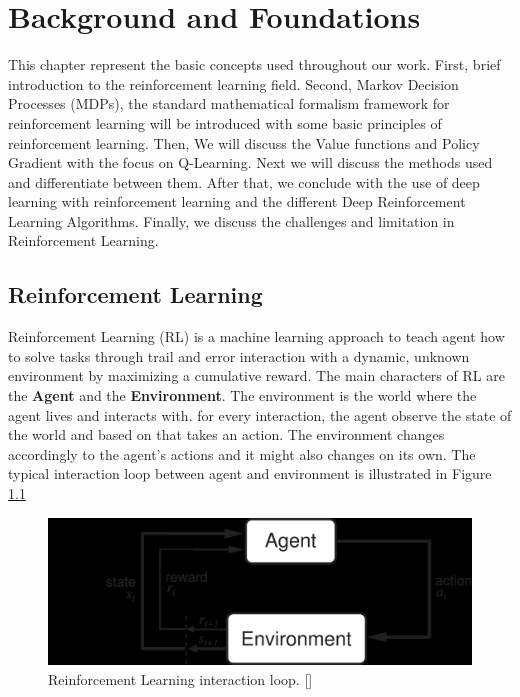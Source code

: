 
\chapter{Background and Foundations}\label{chapter:Background and Foundations}

This chapter represent the basic concepts used throughout our work. First, brief introduction to the reinforcement learning field. Second, Markov Decision Processes (MDPs), the standard mathematical formalism framework for reinforcement learning will be introduced with some basic principles of reinforcement learning. Then, We will discuss the Value functions and Policy Gradient with the focus on Q-Learning. Next we will discuss the methods used and differentiate between them. After that, we conclude with  the use of deep learning with reinforcement learning and the different Deep Reinforcement Learning Algorithms. Finally, we  discuss the challenges and limitation in Reinforcement Learning.

\section{Reinforcement Learning}
Reinforcement Learning (RL) is a machine learning approach to teach agent how to solve tasks through trail and error interaction with a dynamic, unknown environment by maximizing a cumulative reward. The main characters of RL are the \textbf{Agent} and the \textbf{Environment}. The environment is the world where the agent lives and interacts with. for every interaction, the agent observe the state of the world and based on that takes an action. The environment changes accordingly to the agent's actions and it might also changes on its own. The typical interaction loop between agent and environment is illustrated in Figure \ref{fig:Agent_Env}

\begin{figure}
  \includegraphics[width=\linewidth]{figures/Agent-Env.jpg}
  \caption{Reinforcement Learning interaction loop. []}
  \label{fig:Agent_Env}
\end{figure}

